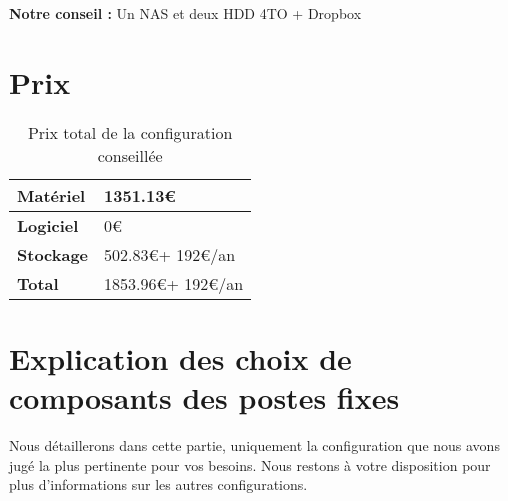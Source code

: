\textbf{Notre conseil :} Un NAS et deux HDD 4TO + Dropbox

\section{Prix}

\begin{table}[ht]
	\centering
	\begin{tabularx}{\textwidth}{|C|X|}
		\hline
		\textbf{Matériel} & 1351.13\euro \\
		\hline
		\textbf{Logiciel} & 0\euro \\
		\hline
		\textbf{Stockage} & 502.83\euro + 192\euro/an \\
		\hline
		\hline
		\textbf{Total} & 1853.96\euro + 192\euro/an \\
		\hline		
	\end{tabularx}
	\caption{Prix total de la configuration conseillée}
	\label{tab:prix}
\end{table}

\section{Explication des choix de composants des postes fixes}

Nous détaillerons dans cette partie, uniquement la configuration que nous avons jugé la plus pertinente pour vos besoins. Nous restons à votre disposition pour plus d'informations sur les autres configurations.

